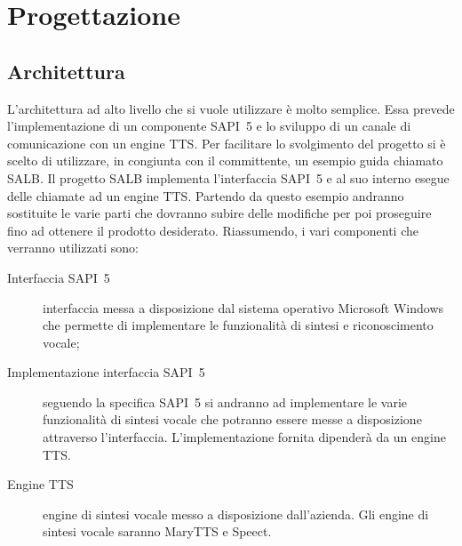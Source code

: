 \chapter{Progettazione} %
\thispagestyle{empty}

\newpage
\section{Architettura}
L'architettura ad alto livello che si vuole utilizzare è molto semplice. Essa prevede l'implementazione di un componente SAPI~5 e lo sviluppo di un canale di comunicazione con un engine TTS.
Per facilitare lo svolgimento del progetto si è scelto di utilizzare, in congiunta con il committente, un esempio guida chiamato SALB.
Il progetto SALB implementa l'interfaccia SAPI~5 e al suo interno esegue delle chiamate ad un engine TTS.
Partendo da questo esempio andranno sostituite le varie parti che dovranno subire delle modifiche per poi proseguire fino ad ottenere il prodotto desiderato.
Riassumendo, i vari componenti che verranno utilizzati sono:
\begin{description}
	\item[Interfaccia SAPI~5] interfaccia messa a disposizione dal sistema operativo Microsoft Windows che permette di implementare le funzionalità di sintesi e riconoscimento vocale;
	\item[Implementazione interfaccia SAPI~5] seguendo la specifica SAPI~5 si andranno ad implementare le varie funzionalità di sintesi vocale che potranno essere messe a disposizione attraverso l'interfaccia. L'implementazione fornita dipenderà da un engine TTS.
	\item[Engine TTS] engine di sintesi vocale messo a disposizione dall'azienda. Gli engine di sintesi vocale saranno MaryTTS e Speect.
\end{description}
	
	
	